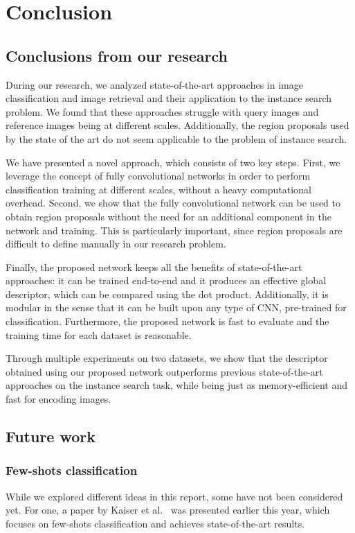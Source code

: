 
\chapter{Conclusion}
\section{Conclusions from our research}
During our research, we analyzed state-of-the-art approaches in
image classification and image retrieval and their application to
the instance search problem. We found that these approaches struggle
with query images and reference images being at different scales.
Additionally, the region proposals used by the state of the art do not
seem applicable to the problem of instance search.

We have presented a novel approach, which consists of two key steps.
First, we leverage the concept of fully convolutional networks in order
to perform classification training at different scales, without a heavy
computational overhead. Second, we show that the fully convolutional
network can be used to obtain region proposals without the need for
an additional component in the network and training. This is particularly
important, since region proposals are difficult to define manually in
our research problem.

Finally, the proposed network keeps all the benefits of state-of-the-art
approaches: it can be trained end-to-end and it produces an effective
global descriptor, which can be compared using the dot product.
Additionally, it is modular in the sense that it can be built upon
any type of CNN, pre-trained for classification.
Furthermore, the proposed network is fast to evaluate and the training
time for each dataset is reasonable.

Through multiple experiments on two datasets, we show that the descriptor
obtained using our proposed network outperforms previous state-of-the-art
approaches on the instance search task, while being just as memory-efficient
and fast for encoding images.

\section{Future work}
\subsection{Few-shots classification}
While we explored different ideas in this report, some have not been
considered yet. For one, a paper by Kaiser et al.~\cite{kaiser_learning_2017}
was presented earlier this year, which focuses on few-shots classification
and achieves state-of-the-art results.


